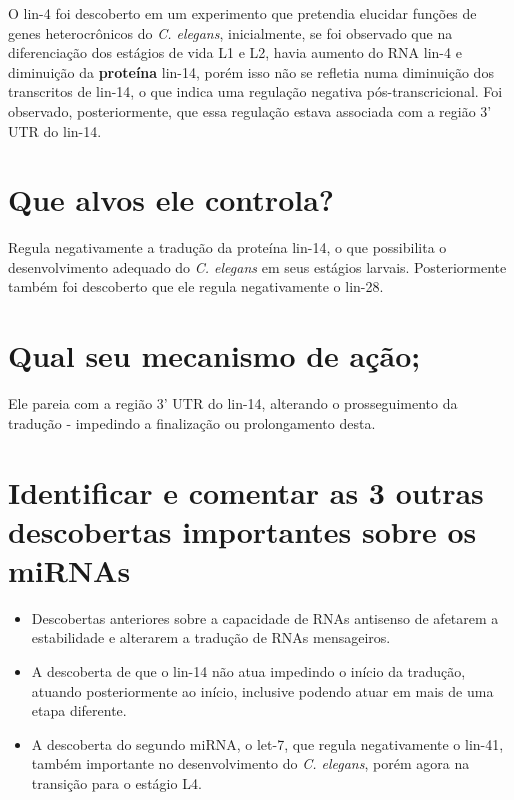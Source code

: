 \documentclass[
]{book}
\begin{document}
O lin-4 foi descoberto em um experimento que pretendia elucidar funções de genes heterocrônicos do \emph{C. elegans}, inicialmente, se foi observado que na diferenciação dos estágios de vida L1 e L2, havia aumento do RNA lin-4 e diminuição da \textbf{proteína} lin-14, porém isso não se refletia numa diminuição dos transcritos de lin-14, o que indica uma regulação negativa pós-transcricional. Foi observado, posteriormente, que essa regulação estava associada com a região 3' UTR do lin-14.

\hypertarget{que-alvos-ele-controla}{%
\section{Que alvos ele controla?}\label{que-alvos-ele-controla}}

Regula negativamente a tradução da proteína lin-14, o que possibilita o desenvolvimento adequado do \emph{C. elegans} em seus estágios larvais. Posteriormente também foi descoberto que ele regula negativamente o lin-28.

\hypertarget{qual-seu-mecanismo-de-auxe7uxe3o}{%
\section{Qual seu mecanismo de ação;}\label{qual-seu-mecanismo-de-auxe7uxe3o}}

Ele pareia com a região 3' UTR do lin-14, alterando o prosseguimento da tradução - impedindo a finalização ou prolongamento desta.

\hypertarget{identificar-e-comentar-as-3-outras-descobertas-importantes-sobre-os-mirnas}{%
\section{Identificar e comentar as 3 outras descobertas importantes sobre os miRNAs}\label{identificar-e-comentar-as-3-outras-descobertas-importantes-sobre-os-mirnas}}

\begin{itemize}
\item
  Descobertas anteriores sobre a capacidade de RNAs antisenso de afetarem a estabilidade e alterarem a tradução de RNAs mensageiros.
\item
  A descoberta de que o lin-14 não atua impedindo o início da tradução, atuando posteriormente ao início, inclusive podendo atuar em mais de uma etapa diferente.
\item
  A descoberta do segundo miRNA, o let-7, que regula negativamente o lin-41, também importante no desenvolvimento do \emph{C. elegans}, porém agora na transição para o estágio L4.
\end{itemize}
\end{document}
